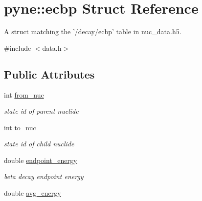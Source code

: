 \hypertarget{structpyne_1_1ecbp}{\section{pyne\+:\+:ecbp Struct Reference}
\label{structpyne_1_1ecbp}
}


A struct matching the '/decay/ecbp' table in nuc\+\_\+data.\+h5.  




{\ttfamily \#include $<$data.\+h$>$}

\subsection*{Public Attributes}
\begin{DoxyCompactItemize}
\item 
\hypertarget{structpyne_1_1ecbp_a0f0a1b5d1058f568e1a9c272a8ccdbb4}{int \hyperlink{structpyne_1_1ecbp_a0f0a1b5d1058f568e1a9c272a8ccdbb4}{from\+\_\+nuc}}\label{structpyne_1_1ecbp_a0f0a1b5d1058f568e1a9c272a8ccdbb4}

\begin{DoxyCompactList}\small\item\em state id of parent nuclide \end{DoxyCompactList}\item 
\hypertarget{structpyne_1_1ecbp_a92cad3076b4ede90958ff54a5d42d9c6}{int \hyperlink{structpyne_1_1ecbp_a92cad3076b4ede90958ff54a5d42d9c6}{to\+\_\+nuc}}\label{structpyne_1_1ecbp_a92cad3076b4ede90958ff54a5d42d9c6}

\begin{DoxyCompactList}\small\item\em state id of child nuclide \end{DoxyCompactList}\item 
\hypertarget{structpyne_1_1ecbp_aa45b0d60f6e64b89f9eb7f6ecac34075}{double \hyperlink{structpyne_1_1ecbp_aa45b0d60f6e64b89f9eb7f6ecac34075}{endpoint\+\_\+energy}}\label{structpyne_1_1ecbp_aa45b0d60f6e64b89f9eb7f6ecac34075}

\begin{DoxyCompactList}\small\item\em beta decay endpoint energy \end{DoxyCompactList}\item 
\hypertarget{structpyne_1_1ecbp_a2ecaf87cb93b936c48f89465958d47f7}{double \hyperlink{structpyne_1_1ecbp_a2ecaf87cb93b936c48f89465958d47f7}{avg\+\_\+energy}}\label{structpyne_1_1ecbp_a2ecaf87cb93b936c48f89465958d47f7}


\end{DoxyCompactItemize}
